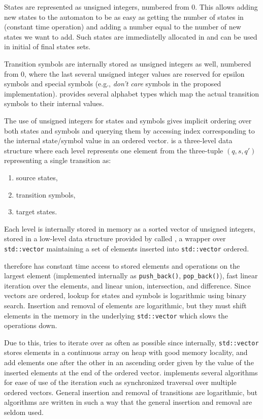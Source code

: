 States are represented as unsigned integers, numbered from 0.
This allows adding new states to the automaton to be as easy as getting the number of states in \deltastruct (constant time operation) and adding a number equal to the number of new states we want to add.
Such states are immediatelly allocated in \deltastruct and can be used in initial of final states sets.

Transition symbols are internally stored as unsigned integers as well, numbered from 0, where the last several unsigned integer values are reserved for epsilon symbols and special symbols (e.g., \emph{don't care} symbols in the proposed \nfts implementation).
\mata provides several alphabet types which map the actual transition symbols to their internal values.

The use of unsigned integers for states and symbols gives implicit ordering over both states and symbols and querying them by accessing index corresponding to the internal state/symbol value in an ordered vector.
\deltastruct is a three-level data structure where each level represents one element from the three-tuple $(q, s, q')$ representing a single transition as:
\begin{enumerate}
    \item source states,
    \item transition symbols,
    \item target states.
\end{enumerate}

Each level is internally stored in memory as a sorted vector of unsigned integers, stored in a low-level data structure provided by \mata called \ordvector, a wrapper over \texttt{std::vector} maintaining a set of elements inserted into \texttt{std::vector} ordered.

\ordvector therefore has constant time access to stored elements and operations on the largest element (implemented internally as \texttt{push\_back()}, \texttt{pop\_back()}), fast linear iteration over the elements, and linear union, intersection, and difference.
Since vectors are ordered, lookup for states and symbols is logarithmic using binary search.
Insertion and removal of elements are logarithmic, but they must shift elements in the memory in the underlying \texttt{std::vector} which slows the operations down.

Due to this, \mata tries to iterate over \ordvector as often as possible since internally, \texttt{std::vector} stores elements in a continuous array on heap with good memory locality, and add elements one after the other in an ascending order given by the value of the inserted elements at the end of the ordered vector.
\mata implements several algorithms for ease of use of the iteration such as synchronized traversal over multiple ordered vectors.
General insertion and removal of transitions are logarithmic, but \mata algorithms are written in such a way that the general insertion and removal are seldom used.

